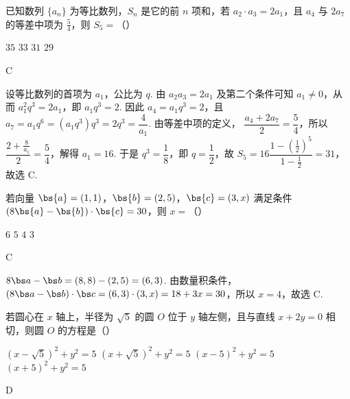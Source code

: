\begin{problem}
已知数列 \(\{a_n\}\) 为等比数列，\(S_n\) 是它的前 \(n\) 项和，若 \(a_2 \cdot a_3 = 2a_1\)，且 \(a_4\) 与 \(2a_7\) 的等差中项为 \(\frac{5}{4}\)，则 \(S_5 =\)（\quad）

\choices
    {\(35\)}
    {\(33\)}
    {\(31\)}
    {\(29\)}
\end{problem}

\begin{answer}
C
\end{answer}

\begin{solution}
设等比数列的首项为 \(a_1\)，公比为 \(q\). 由 \(a_2a_3=2a_1\) 及第二个条件可知 \(a_1\ne0\)，从而
\(a_1^2q^3=2a_1\)，即 \(a_1q^3=2\). 因此 \(a_4=a_1q^3=2\)，且
\(a_7=a_1q^6=(a_1q^3)q^3=2q^3=\dfrac{4}{a_1}\). 由等差中项的定义，
\(\dfrac{a_4+2a_7}{2}=\dfrac54\)，所以 \(\dfrac{2+\frac{8}{a_1}}{2}=\dfrac54\)，解得 \(a_1=16\). 于是 \(q^3=\dfrac18\)，即 \(q=\dfrac12\)，故
\(S_5=16\dfrac{1-(\frac{1}{2})^5}{1-\frac{1}{2}}=31\)，故选 C.
\end{solution}

\begin{problem}
若向量 \(\bs{a} = (1, 1)\)，\(\bs{b} = (2, 5)\)，\(\bs{c} = (3, x)\) 满足条件 \(\left(8\bs{a} - \bs{b}\right) \cdot \bs{c} = 30\)，则 \(x =\)（\quad）

\choices
    {\(6\)}
    {\(5\)}
    {\(4\)}
    {\(3\)}
\end{problem}

\begin{answer}
C
\end{answer}

\begin{solution}
\(8\bs a-\bs b=(8,8)-(2,5)=(6,3)\). 由数量积条件，
\((8\bs a-\bs b)\cdot\bs c=(6,3)\cdot(3,x)=18+3x=30\)，所以 \(x=4\)，故选 C.
\end{solution}

\begin{problem}
若圆心在 \(x\) 轴上，半径为 \(\sqrt{5}\) 的圆 \(O\) 位于 \(y\) 轴左侧，且与直线 \(x + 2y = 0\) 相切，则圆 \(O\) 的方程是（\quad）

\choices
    {\(\left(x - \sqrt{5}\right)^2 + y^2 = 5\)}
    {\(\left(x + \sqrt{5}\right)^2 + y^2 = 5\)}
    {\((x - 5)^2 + y^2 = 5\)}
    {\((x + 5)^2 + y^2 = 5\)}
\end{problem}

\begin{answer}
D
\end{answer}

